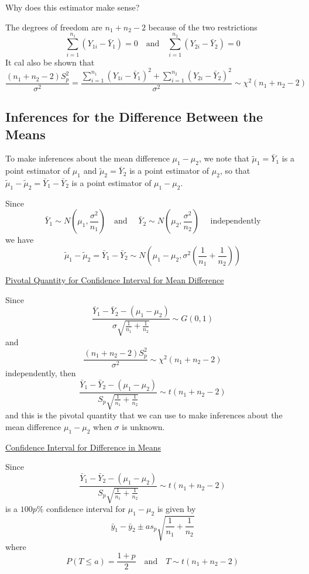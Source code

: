 \documentclass[oneside]{book}
\begin{document}
Why does this estimator make sense?

The degrees of freedom are $ n_1+n_2-2 $ because of the two restrictions
\[\sum_{i=1}^{n_{1}}\left(Y_{1 i}-\bar{Y}_{1}\right)=0 \quad \text{and} \quad \sum_{i=1}^{n_{2}}\left(Y_{2 i}-\bar{Y}_{2}\right)=0\]
It cal also be shown that
\[\frac{\left(n_{1}+n_{2}-2\right) S_{p}^{2}}{\sigma^{2}}=\frac{\sum_{i=1}^{n_{1}}\left(Y_{1 i}-\bar{Y}_{1}\right)^{2}+\sum_{i=1}^{n_{2}}
    \left(Y_{2 i}-\bar{Y}_{2}\right)^{2}}{\sigma^{2}} \sim \chi^{2}\left(n_{1}+n_{2}-2\right)\]


\subsection{Inferences for the Difference Between the Means}
To make inferences about the mean difference $ \mu_1-\mu_2 $,
we note that $ \tilde{\mu}_1=\bar{Y}_1 $ is a point estimator of $ \mu_1 $ and
$ \tilde{\mu}_2=\bar{Y}_2 $ is a point estimator of $ \mu_2 $, so that $ \tilde{\mu}_1-
    \tilde{\mu}_2=\bar{Y}_1-\bar{Y}_2 $ is a point estimator of $ \mu_1-\mu_2 $.

Since
\[\bar{Y}_{1} \sim N\left(\mu_{1}, \frac{\sigma^{2}}{n_{1}}\right) \quad \text{and } \quad \bar{Y}_{2} \sim N\left(\mu_{2}, \frac{\sigma^{2}}{n_{2}}\right) \quad \text{ independently}\]
we have
\[\tilde{\mu}_{1}-\tilde{\mu}_{2}=\bar{Y}_{1}-\bar{Y}_{2}
    \sim N\left(\mu_{1}-\mu_{2}, \sigma^{2}\left(\frac{1}{n_{1}}+\frac{1}{n_{2}}\right)\right)\]

\underline{Pivotal Quantity for Confidence Interval for Mean Difference}

Since
\[\frac{\bar{Y}_{1}-\bar{Y}_{2}-\left(\mu_{1}-\mu_{2}\right)}{\sigma \sqrt{\frac{1}{n_{1}}+\frac{1}{n_{2}}}} \sim G(0,1)\]
and
\[\frac{\left(n_{1}+n_{2}-2\right) S_{p}^{2}}{\sigma^{2}} \sim \chi^{2}\left(n_{1}+n_{2}-2\right)\]
independently, then
\[\frac{\bar{Y}_{1}-\bar{Y}_{2}-\left(\mu_{1}-\mu_{2}\right)}{S_{p} \sqrt{\frac{1}{n_{1}}+\frac{1}{n_{2}}}} \sim t\left(n_{1}+n_{2}-2\right)\]
and this is the pivotal quantity that we can use to make inferences about the mean difference
$ \mu_1-\mu_2 $ when $ \sigma $ is unknown.

\underline{Confidence Interval for Difference in Means}

Since
\[\frac{\bar{Y}_{1}-\bar{Y}_{2}-\left(\mu_{1}-\mu_{2}\right)}{S_{p} \sqrt{\frac{1}{n_{1}}+\frac{1}{n_{2}}}} \sim t\left(n_{1}+n_{2}-2\right)\]
is a $ 100p\% $ confidence interval for $ \mu_1-\mu_2 $ is given by
\[\bar{y}_{1}-\bar{y}_{2} \pm a s_{p} \sqrt{\frac{1}{n_{1}}+\frac{1}{n_{2}}}\]
where
\[P(T \leq a)=\frac{1+p}{2} \quad \text{and} \quad T \sim t\left(n_{1}+n_{2}-2\right)\]
\end{document}
